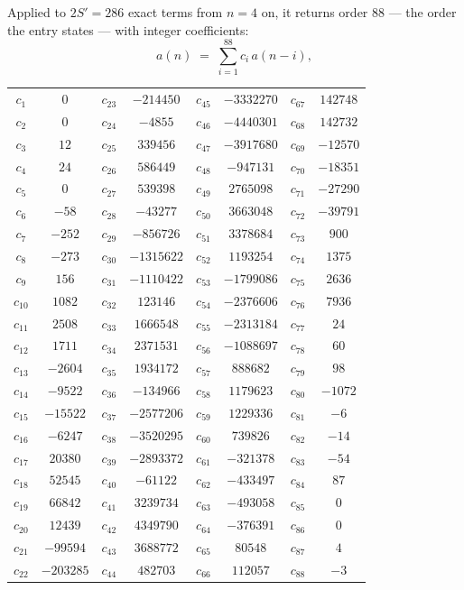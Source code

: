\documentclass[11pt,a4paper]{article}
\theoremstyle{plain}
\theoremstyle{definition}
\begin{document}
Applied to $2S'=286$ exact terms from $n=4$ on, it returns order $88$ --- the
order the entry states --- with integer coefficients:
\[
a(n)\;=\;\sum_{i=1}^{88}c_i\,a(n-i),
\]
\begin{center}\small
\begin{tabular}{cccccccc}
$c_{1}$ & $0$ & $c_{23}$ & $-214450$ & $c_{45}$ & $-3332270$ & $c_{67}$ & $142748$ \\
$c_{2}$ & $0$ & $c_{24}$ & $-4855$ & $c_{46}$ & $-4440301$ & $c_{68}$ & $142732$ \\
$c_{3}$ & $12$ & $c_{25}$ & $339456$ & $c_{47}$ & $-3917680$ & $c_{69}$ & $-12570$ \\
$c_{4}$ & $24$ & $c_{26}$ & $586449$ & $c_{48}$ & $-947131$ & $c_{70}$ & $-18351$ \\
$c_{5}$ & $0$ & $c_{27}$ & $539398$ & $c_{49}$ & $2765098$ & $c_{71}$ & $-27290$ \\
$c_{6}$ & $-58$ & $c_{28}$ & $-43277$ & $c_{50}$ & $3663048$ & $c_{72}$ & $-39791$ \\
$c_{7}$ & $-252$ & $c_{29}$ & $-856726$ & $c_{51}$ & $3378684$ & $c_{73}$ & $900$ \\
$c_{8}$ & $-273$ & $c_{30}$ & $-1315622$ & $c_{52}$ & $1193254$ & $c_{74}$ & $1375$ \\
$c_{9}$ & $156$ & $c_{31}$ & $-1110422$ & $c_{53}$ & $-1799086$ & $c_{75}$ & $2636$ \\
$c_{10}$ & $1082$ & $c_{32}$ & $123146$ & $c_{54}$ & $-2376606$ & $c_{76}$ & $7936$ \\
$c_{11}$ & $2508$ & $c_{33}$ & $1666548$ & $c_{55}$ & $-2313184$ & $c_{77}$ & $24$ \\
$c_{12}$ & $1711$ & $c_{34}$ & $2371531$ & $c_{56}$ & $-1088697$ & $c_{78}$ & $60$ \\
$c_{13}$ & $-2604$ & $c_{35}$ & $1934172$ & $c_{57}$ & $888682$ & $c_{79}$ & $98$ \\
$c_{14}$ & $-9522$ & $c_{36}$ & $-134966$ & $c_{58}$ & $1179623$ & $c_{80}$ & $-1072$ \\
$c_{15}$ & $-15522$ & $c_{37}$ & $-2577206$ & $c_{59}$ & $1229336$ & $c_{81}$ & $-6$ \\
$c_{16}$ & $-6247$ & $c_{38}$ & $-3520295$ & $c_{60}$ & $739826$ & $c_{82}$ & $-14$ \\
$c_{17}$ & $20380$ & $c_{39}$ & $-2893372$ & $c_{61}$ & $-321378$ & $c_{83}$ & $-54$ \\
$c_{18}$ & $52545$ & $c_{40}$ & $-61122$ & $c_{62}$ & $-433497$ & $c_{84}$ & $87$ \\
$c_{19}$ & $66842$ & $c_{41}$ & $3239734$ & $c_{63}$ & $-493058$ & $c_{85}$ & $0$ \\
$c_{20}$ & $12439$ & $c_{42}$ & $4349790$ & $c_{64}$ & $-376391$ & $c_{86}$ & $0$ \\
$c_{21}$ & $-99594$ & $c_{43}$ & $3688772$ & $c_{65}$ & $80548$ & $c_{87}$ & $4$ \\
$c_{22}$ & $-203285$ & $c_{44}$ & $482703$ & $c_{66}$ & $112057$ & $c_{88}$ & $-3$ \\
\end{tabular}
\end{center}
\end{document}
